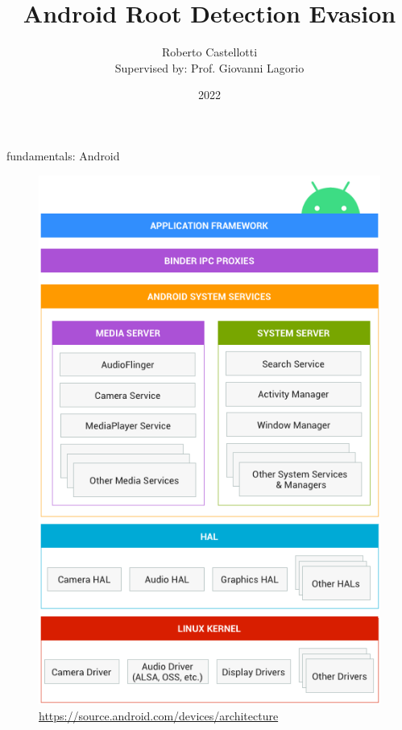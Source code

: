 \documentclass{beamer}
\title{Android Root Detection Evasion}
\author[Roberto Castellotti]{Roberto Castellotti \\ {\small Supervised by: Prof. Giovanni Lagorio}}
\institute{Università di Genova}
\date{2022}
\begin{document}
\frame{\titlepage}

\begin{frame}{fundamentals: Android}

    \begin{figure}
        \centering \includegraphics[scale=0.25]{android.png}
        \caption{\href{https://source.android.com/devices/architecture}{https://source.android.com/devices/architecture}}
    \end{figure}

\end{frame}
\end{document}
